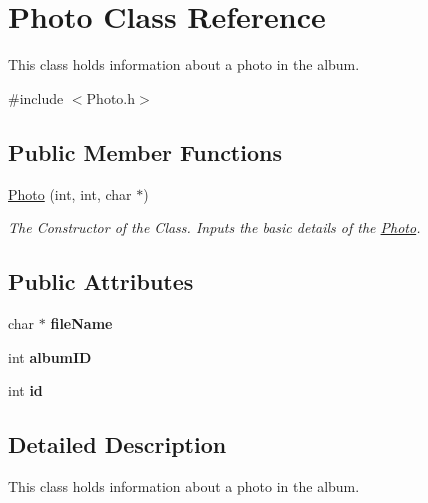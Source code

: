 \hypertarget{classPhoto}{\section{Photo Class Reference}
\label{d3/d9f/classPhoto}
}


This class holds information about a photo in the album.  




{\ttfamily \#include $<$Photo.\-h$>$}

\subsection*{Public Member Functions}
\begin{DoxyCompactItemize}
\item 
\hyperlink{classPhoto_abc8b160277f4847ef1a79f16512f3f57}{Photo} (int, int, char $\ast$)
\begin{DoxyCompactList}\small\item\em The Constructor of the Class. Inputs the basic details of the \hyperlink{classPhoto}{Photo}. \end{DoxyCompactList}\end{DoxyCompactItemize}
\subsection*{Public Attributes}
\begin{DoxyCompactItemize}
\item 
\hypertarget{classPhoto_a43aa0f80f213c43091e2a43ec15aa788}{char $\ast$ {\bfseries file\-Name}}\label{d3/d9f/classPhoto_a43aa0f80f213c43091e2a43ec15aa788}

\item 
\hypertarget{classPhoto_aee5cc0bcfefef158848494c442e75634}{int {\bfseries album\-I\-D}}\label{d3/d9f/classPhoto_aee5cc0bcfefef158848494c442e75634}

\item 
\hypertarget{classPhoto_a4433c330a6ffcbd9fe6c5c0f13a36e7b}{int {\bfseries id}}\label{d3/d9f/classPhoto_a4433c330a6ffcbd9fe6c5c0f13a36e7b}

\end{DoxyCompactItemize}


\subsection{Detailed Description}
This class holds information about a photo in the album. 

